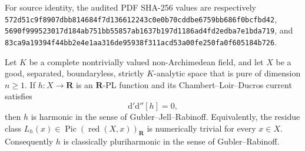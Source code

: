For source identity, the audited PDF SHA-256 values are respectively
\texttt{572d51c9f8907dbb814684f7d136612243c0e0b70cddbe6759bb686f0bcfbd42},
\texttt{5690f999523017d184ab751bb55857ab1637b197d1186ad4fd2edba7e1bda719},
and
\texttt{83ca9a19394f44bb2e4e1aa316de95938f311acd53a00fe250fa0f605184b726}.

\begin{proposition}
Let $K$ be a complete nontrivially valued non-Archimedean field, and let
$X$ be a good, separated, boundaryless, strictly $K$-analytic space that is
pure of dimension $n\geq1$.  If $h:X\to\mathbf R$ is an $\mathbf R$-PL function and
its Chambert--Loir--Ducros current satisfies
\[
                         \mathrm d'\mathrm d''[h]=0,
\]
then $h$ is harmonic in the sense of Gubler--Jell--Rabinoff.  Equivalently,
the residue class $L_h(x)\in\operatorname{Pic}(\operatorname{red}(X,x))_
{\mathbf R}$ is numerically trivial for every $x\in X$.  Consequently $h$
is classically pluriharmonic in the sense of Gubler--Rabinoff.
\end{proposition}

